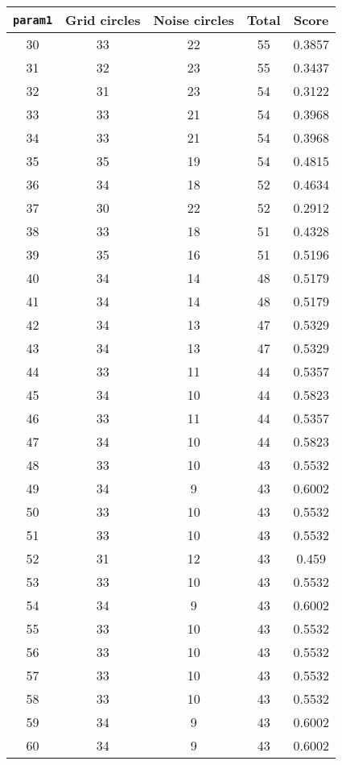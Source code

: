 \documentclass[letterpaper, 12pt]{article}
\begin{document}
\begin{longtable}{|c|c|c|c|c|}
\hline
\textbf{\texttt{param1}} & \textbf{Grid circles} & \textbf{Noise circles} & \textbf{Total} & \textbf{Score} \\
\hline
30 & 33 & 22 & 55 & 0.3857 \\
\hline
31 & 32 & 23 & 55 & 0.3437 \\
\hline
32 & 31 & 23 & 54 & 0.3122 \\
\hline
33 & 33 & 21 & 54 & 0.3968 \\
\hline
34 & 33 & 21 & 54 & 0.3968 \\
\hline
35 & 35 & 19 & 54 & 0.4815 \\
\hline
36 & 34 & 18 & 52 & 0.4634 \\
\hline
37 & 30 & 22 & 52 & 0.2912 \\
\hline
38 & 33 & 18 & 51 & 0.4328 \\
\hline
39 & 35 & 16 & 51 & 0.5196 \\
\hline
40 & 34 & 14 & 48 & 0.5179 \\
\hline
41 & 34 & 14 & 48 & 0.5179 \\
\hline
42 & 34 & 13 & 47 & 0.5329 \\
\hline
43 & 34 & 13 & 47 & 0.5329 \\
\hline
44 & 33 & 11 & 44 & 0.5357 \\
\hline
45 & 34 & 10 & 44 & 0.5823 \\
\hline
46 & 33 & 11 & 44 & 0.5357 \\
\hline
47 & 34 & 10 & 44 & 0.5823 \\
\hline
48 & 33 & 10 & 43 & 0.5532 \\
\hline
49 & 34 & 9 & 43 & 0.6002 \\
\hline
50 & 33 & 10 & 43 & 0.5532 \\
\hline
51 & 33 & 10 & 43 & 0.5532 \\
\hline
52 & 31 & 12 & 43 & 0.459 \\
\hline
53 & 33 & 10 & 43 & 0.5532 \\
\hline
54 & 34 & 9 & 43 & 0.6002 \\
\hline
55 & 33 & 10 & 43 & 0.5532 \\
\hline
56 & 33 & 10 & 43 & 0.5532 \\
\hline
57 & 33 & 10 & 43 & 0.5532 \\
\hline
58 & 33 & 10 & 43 & 0.5532 \\
\hline
59 & 34 & 9 & 43 & 0.6002 \\
\hline
60 & 34 & 9 & 43 & 0.6002 \\

\end{longtable}
\end{document}
